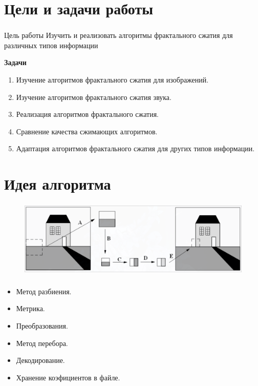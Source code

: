 \documentclass[t aspectratio=169]{beamer}
\begin{document}
  \section{Цели и задачи работы}
  \begin{frame}\frametitle{\insertsection}
    \large
    \begin{block}{Цель работы}
      Изучить и реализовать алгоритмы фрактального сжатия для различных типов информации
    \end{block}

    \vspace{0.5em}
    \textbf{Задачи}
    \begin{enumerate}
      \item Изучение алгоритмов фрактального сжатия для изображений.
      \item Изучение алгоритмов фрактального сжатия звука.
      \item Реализация алгоритмов фрактального сжатия.
      \item Сравнение качества сжимающих алгоритмов.
      \item Адаптация алгоритмов фрактального сжатия для других типов информации.
    \end{enumerate}
    \normalfont
  \end{frame}

  \section{Идея алгоритма}
  \begin{frame}\frametitle{\insertsection}
    \begin{figure}
      \begin{center}
        \includegraphics[width=\textwidth]{./images/algorithm-illustration.png}
      \end{center}
    \end{figure}
  \end{frame}

  \begin{frame}\frametitle{\insertsection}
    \large
    \begin{itemize}
      \item Метод разбиения.
      \item Метрика.
      \item Преобразования.
      \item Метод перебора.
      \item Декодирование.
      \item Хранение коэфициентов в файле.
    \end{itemize}
    \normalfont
  \end{frame}
\end{document}

